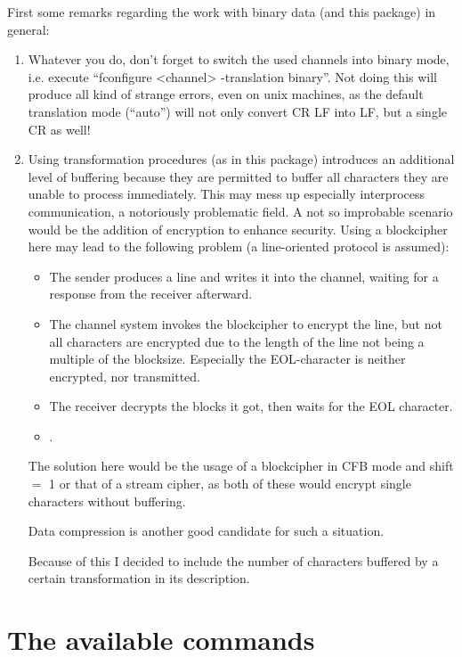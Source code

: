 \documentclass {report}
\begin{document}
First some remarks regarding the work with binary data (and this
package) in general:

\begin {enumerate}
\item	Whatever you do, don't forget to switch the used channels into
	binary mode, i.e. execute ``fconfigure <channel> -translation
	binary''. Not doing this will produce all kind of strange
	errors, even on unix machines, as the default translation mode
	(``auto'') will not only convert CR LF into LF, but a single
	CR as well!

\item	Using transformation procedures (as in this package)
	introduces an additional level of buffering because they are
	permitted to buffer all characters they are unable to process
	immediately. This may mess up especially
	interprocess communication, a notoriously problematic field. A
	not so improbable scenario would be the addition of encryption
	to enhance security. Using a blockcipher here may lead to the
	following problem (a line-oriented protocol is assumed):

	\begin {itemize}
	\item	The sender produces a line and writes it into the channel,
		waiting for a response from the receiver afterward.
	\item	The channel system invokes the blockcipher to encrypt
		the line, but not all characters are encrypted due to
		the length of the line not being a multiple of the
		blocksize. Especially the EOL-character is neither
		encrypted, nor transmitted.
	\item	The receiver decrypts the blocks it got, then waits
		for the EOL character.
	\item	{}.
	\end   {itemize}

	The solution here would be the usage of a blockcipher in CFB
	mode and shift $=$ 1 or that of a stream cipher, as both of these
	would encrypt single characters without buffering.

	Data compression is another good candidate for such a situation.

	Because of this I decided to include the number of characters
	buffered by a certain transformation in its description.

\end   {enumerate}


\chapter {The available commands}
\end{document}
